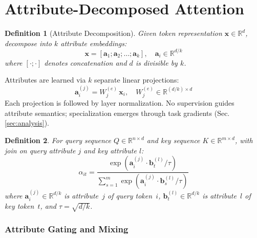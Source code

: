 \documentclass[conference]{IEEEtran}
\newtheorem{definition}{Definition}
\newcommand{\R}{\mathbb{R}}
\begin{document}
\section{Attribute-Decomposed Attention}
\label{sec:method}


\begin{definition}[Attribute Decomposition]
Given token representation $\mathbf{x} \in \R^d$, decompose into $k$ attribute embeddings:
\begin{equation}
\mathbf{x} = [\mathbf{a}_1; \mathbf{a}_2; \ldots; \mathbf{a}_k], \quad \mathbf{a}_i \in \R^{d/k}
\end{equation}
where $[\cdot;\cdot]$ denotes concatenation and $d$ is divisible by $k$.
\end{definition}

Attributes are learned via $k$ separate linear projections:
\begin{equation}
\mathbf{a}_i^{(j)} = W_j^{(e)}\,\mathbf{x}_i, \quad W_j^{(e)} \in \R^{(d/k)\times d}
\end{equation}
Each projection is followed by layer normalization. No supervision guides attribute semantics; specialization emerges through task gradients (Sec.\ref{sec:analysis}).


\begin{definition}For query sequence $Q \in \R^{n \times d}$ and key sequence $K \in \R^{m \times d}$, with join on query attribute $j$ and key attribute $l$:
\begin{equation}
\alpha_{it} = \frac{\exp\!\left(\mathbf{a}_i^{(j)} \cdot \mathbf{b}_t^{(l)} / \tau\right)}{\sum_{s=1}^{m} \exp\!\left(\mathbf{a}_i^{(j)} \cdot \mathbf{b}_s^{(l)} / \tau\right)}
\label{eq:join}
\end{equation}
where $\mathbf{a}_i^{(j)} \in \R^{d/k}$ is attribute~$j$ of query token~$i$, $\mathbf{b}_t^{(l)} \in \R^{d/k}$ is attribute~$l$ of key token~$t$, and $\tau = \sqrt{d/k}$.
\end{definition}

\subsubsection{Attribute Gating and Mixing}
\end{document}
